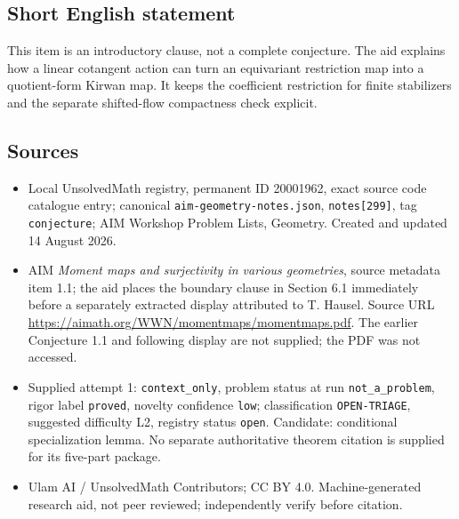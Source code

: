 \documentclass[11pt]{article}
\begin{document}
\subsection{Short English statement}
This item is an introductory clause, not a complete conjecture. The aid explains how a linear cotangent action can turn an equivariant restriction map into a quotient-form Kirwan map. It keeps the coefficient restriction for finite stabilizers and the separate shifted-flow compactness check explicit.
\subsection{Sources}
\begin{itemize}
\item Local UnsolvedMath registry, permanent ID 20001962, exact source code catalogue entry; canonical \texttt{aim-geometry-notes.json}, \texttt{notes[299]}, tag \texttt{conjecture}; AIM Workshop Problem Lists, Geometry. Created and updated 14 August 2026.
\item AIM \emph{Moment maps and surjectivity in various geometries}, source metadata item 1.1; the aid places the boundary clause in Section 6.1 immediately before a separately extracted display attributed to T. Hausel. Source URL \url{https://aimath.org/WWN/momentmaps/momentmaps.pdf}. The earlier Conjecture 1.1 and following display are not supplied; the PDF was not accessed.
\item Supplied attempt 1: \texttt{context\_only}, problem status at run \texttt{not\_a\_problem}, rigor label \texttt{proved}, novelty confidence \texttt{low}; classification \texttt{OPEN-TRIAGE}, suggested difficulty L2, registry status \texttt{open}. Candidate: conditional specialization lemma. No separate authoritative theorem citation is supplied for its five-part package.
\item Ulam AI / UnsolvedMath Contributors; CC BY 4.0. Machine-generated research aid, not peer reviewed; independently verify before citation.
\end{itemize}
\end{document}
